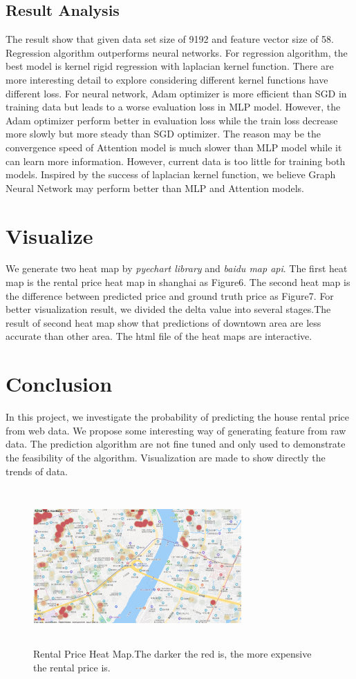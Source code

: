 \documentclass[final]{cvpr}
\begin{document}
\subsection{Result Analysis}
The result show that given data set size of 9192 and feature vector size of 58. Regression algorithm outperforms neural networks. For regression algorithm, the best model is kernel rigid regression with laplacian kernel function. There are more interesting detail to explore considering different kernel functions have different loss. For neural network, Adam optimizer is more efficient than SGD in training data but leads to a worse evaluation loss in MLP model. However, the Adam optimizer perform better in evaluation loss while the train loss decrease more slowly but more steady than SGD optimizer. The reason may be the convergence speed of Attention model is much slower than MLP model while it can learn more information. However, current data is too little for training both models. Inspired by the success of laplacian kernel function, we believe Graph Neural Network may perform better than MLP and Attention models.

\section{Visualize}
We generate two heat map by \textit{pyechart library} and \textit{baidu map api}. The first heat map is the rental price heat map in shanghai as Figure6. The second heat map is the difference between predicted price and ground truth price as Figure7. For better visualization result, we divided the delta value into several stages.The result of second heat map show that predictions of downtown area are less accurate than other area. The html file of the heat maps are interactive.

\section{Conclusion}
In this project, we investigate the probability of predicting the house rental price from web data. We propose some interesting way of generating feature from raw data. The prediction algorithm are not fine tuned and only used to demonstrate the feasibility of the algorithm. Visualization are made to show directly the trends of data.
\begin{figure}[h]
\centering
\includegraphics[width=8cm,height=6cm]{p6.jpg}
\caption{Rental Price Heat Map.The darker the red is, the more expensive the rental price is.}
\end{figure}
\end{document}
